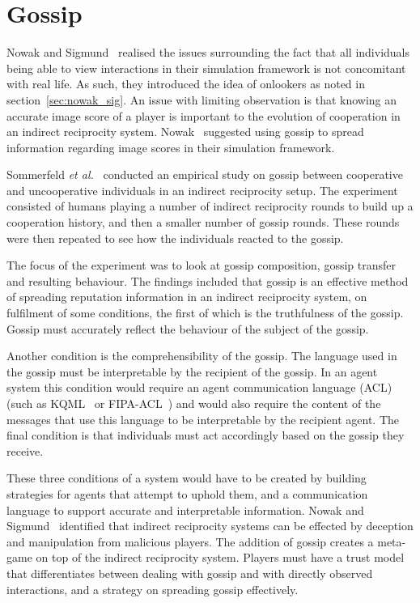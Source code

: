 \documentclass[]{final_report}
\begin{document}
\section{Gossip}
Nowak and Sigmund~\cite{evol_indirect_image} realised the issues surrounding the fact that all individuals being able to view interactions in their simulation framework is not concomitant with real life. As such, they introduced the idea of onlookers as noted in section~\ref{sec:nowak_sig}. An issue with limiting observation is that knowing an accurate image score of a player is important to the evolution of cooperation in an indirect reciprocity system. Nowak~\cite{five_rules_coop} suggested using gossip to spread information regarding image scores in their simulation framework.\par
Sommerfeld \textit{et al.}~\cite{gossip_alt} conducted an empirical study on gossip between cooperative and uncooperative individuals in an indirect reciprocity setup. The experiment consisted of humans playing a number of indirect reciprocity rounds to build up a cooperation history, and then a smaller number of gossip rounds. These rounds were then repeated to see how the individuals reacted to the gossip.\par
The focus of the experiment was to look at gossip composition, gossip transfer and resulting behaviour. The findings included that gossip is an effective method of spreading reputation information in an indirect reciprocity system, on fulfilment of some conditions, the first of which is the truthfulness of the gossip. Gossip must accurately reflect the behaviour of the subject of the gossip.\par
Another condition is the comprehensibility of the gossip. The language used in the gossip must be interpretable by the recipient of the gossip. In an agent system this condition would require an agent communication language (ACL) (such as KQML~\cite{finin1994kqml} or FIPA-ACL~\cite{o1998fipa}) and would also require the content of the messages that use this language to be interpretable by the recipient agent. The final condition is that individuals must act accordingly based on the gossip they receive.\par
These three conditions of a system would have to be created by building strategies for agents that attempt to uphold them, and a communication language to support accurate and interpretable information. Nowak and Sigmund~\cite{evol_indirect_image} identified that indirect reciprocity systems can be effected by deception and manipulation from malicious players. The addition of gossip creates a meta-game on top of the indirect reciprocity system. Players must have a trust model that differentiates between dealing with gossip and with directly observed interactions, and a strategy on spreading gossip effectively.
\end{document}
